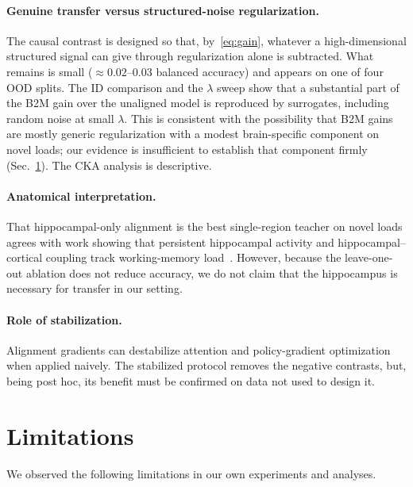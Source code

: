 \documentclass[conference]{IEEEtran}
\begin{document}
\paragraph{Genuine transfer versus structured-noise regularization.}
The causal contrast is designed so that, by~\eqref{eq:gain}, whatever a high-dimensional structured signal can give through regularization alone is subtracted. What remains is small ($\approx0.02$--$0.03$ balanced accuracy) and appears on one of four OOD splits. The ID comparison and the $\lambda$ sweep show that a substantial part of the B2M gain over the unaligned model is reproduced by surrogates, including random noise at small $\lambda$. This is consistent with the possibility that B2M gains are mostly generic regularization with a modest brain-specific component on novel loads; our evidence is insufficient to establish that component firmly (Sec.~\ref{sec:lim}). The CKA analysis is descriptive.

\paragraph{Anatomical interpretation.}
That hippocampal-only alignment is the best single-region teacher on novel loads agrees with work showing that persistent hippocampal activity and hippocampal--cortical coupling track working-memory load~\cite{boran2019sciadv}. However, because the leave-one-out ablation does not reduce accuracy, we do not claim that the hippocampus is necessary for transfer in our setting.

\paragraph{Role of stabilization.}
Alignment gradients can destabilize attention and policy-gradient optimization when applied naively. The stabilized protocol removes the negative contrasts, but, being post hoc, its benefit must be confirmed on data not used to design it.

\section{Limitations}\label{sec:lim}
We observed the following limitations in our own experiments and analyses.
\end{document}

